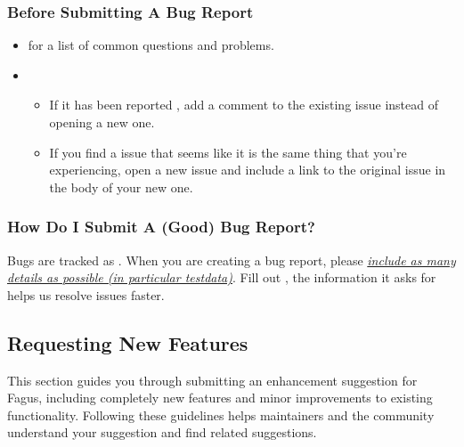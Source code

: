 \documentclass[a4paper,10pt,english]{sphinxmanual}
\begin{document}
\subsubsection{Before Submitting A Bug Report}
\label{\detokenize{CONTRIBUTING:before-submitting-a-bug-report}}\begin{itemize}
\item {}
\sphinxAtStartPar
{} for a list of common questions and problems.

\item {}
\sphinxAtStartPar
{}
\begin{itemize}
\item {}
\sphinxAtStartPar
If it has been reported , add a comment to the existing issue instead of opening a new one.

\item {}
\sphinxAtStartPar
If you find a  issue that seems like it is the same thing that you’re experiencing, open a new issue and include a link to the original issue in the body of your new one.

\end{itemize}

\end{itemize}


\subsubsection{How Do I Submit A (Good) Bug Report?}
\label{\detokenize{CONTRIBUTING:how-do-i-submit-a-good-bug-report}}
\sphinxAtStartPar
Bugs are tracked as . When you are creating a bug report, please {\hyperref[\detokenize{CONTRIBUTING:how-do-i-submit-a-good-bug-report}]{\emph{include as many details as possible (in particular test\sphinxhyphen{}data)}}}. Fill out , the information it asks for helps us resolve issues faster.


\subsection{Requesting New Features}
\label{\detokenize{CONTRIBUTING:requesting-new-features}}
\sphinxAtStartPar
This section guides you through submitting an enhancement suggestion for Fagus, including completely new features and minor improvements to existing functionality. Following these guidelines helps maintainers and the community understand your suggestion and find related suggestions.
\end{document}
